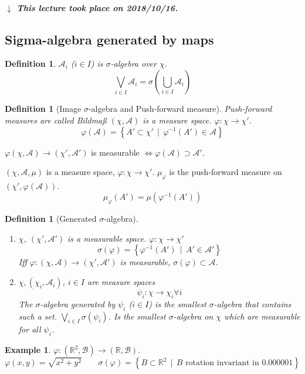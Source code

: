 \documentclass[a4paper]{article}
\newcounter{lecref}[section]
\numberwithin{lecref}{section}
\theoremstyle{break}
\newtheorem*{Example}{Example}
\newtheorem{definition}[lecref]{Definition}
\newcommand{\dateref}[1]{%
  \begin{mdframed}[backgroundcolor=gray!10,innerbottommargin=0pt,innertopmargin=0pt]
    \paragraph{\textit{$\downarrow$ This lecture took place on #1.}}%
  \end{mdframed}%
}
\newcommand{\SetDef}[2]{\left\{#1\,\mid\,#2\right\}}
\begin{document}
\dateref{2018/10/16}

\subsection{Sigma-algebra generated by maps}

\begin{definition}
  $\mathcal A_i$ ($i \in I$) is $\sigma$-algebra over $\chi$.
  \[ \bigvee_{i \in I} \mathcal A_i = \sigma\left(\bigcup_{i \in I} \mathcal A_i\right) \]
\end{definition}

\begin{definition}[Image $\sigma$-algebra and Push-forward measure]
  Push-forward measures are called \foreignlanguage{german}{Bildmaß}
  $(\chi, \mathcal A)$ is a measure space. $\varphi: \chi \to \chi'$.
  \[ \varphi(\mathcal A) = \SetDef{A' \subset \chi'}{\varphi^{-1}(A') \in \mathcal A} \]
\end{definition}

$\varphi(\chi, \mathcal A) \to (\chi', \mathcal A')$ is measurable $\iff \varphi(\mathcal A) \supset \mathcal A'$.

$(\chi, \mathcal A, \mu)$ is a measure space, $\varphi: \chi \to \chi'$.
$\mu_{\varphi}$ is the push-forward measure on $(\chi', \varphi(\mathcal A))$.
\[ \mu_{\varphi}(A') = \mu(\varphi^{-1}(A')) \]

\begin{definition}[Generated $\sigma$-algebra]
  \begin{enumerate}
    \item $\chi$, $(\chi', \mathcal A')$ is a measurable space.
      $\varphi: \chi \to \chi'$
      \[ \sigma(\varphi) = \SetDef{\varphi^{-1}(A')}{A' \in \mathcal A'} \]
      Iff $\varphi: (\chi, \mathcal A) \to (\chi', \mathcal A')$ is measurable,
      $\sigma(\varphi) \subset \mathcal A$.
    \item $\chi, (\chi_i, \mathcal A_i)$, $i \in I$ are measure spaces
      \[ \psi_i: \chi \to \chi_i \forall i \]
      The $\sigma$-algebra generated by $\psi_i$ ($i \in I$) is the smallest $\sigma$-algebra that contains such a set.
      $\bigvee_{i \in I} \sigma(\psi_i)$. Is the smallest $\sigma$-algebra on $\chi$ which are measurable for all $\psi_i$.
  \end{enumerate}
\end{definition}

\begin{Example}
  $\varphi: (\mathbb R^2, \mathcal B) \to (\mathbb R, \mathcal B)$.
  \[ \varphi(x, y) = \sqrt{x^2 + y^2} \qquad \sigma(\varphi) = \SetDef{B \subset \mathbb R^2}{B \text{ rotation invariant in $0.000001$}} \]
\end{Example}
\end{document}
